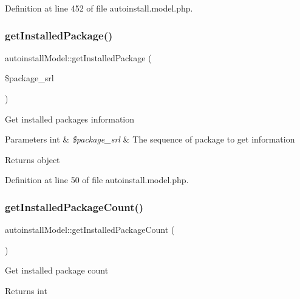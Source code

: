 Definition at line 452 of file autoinstall.\+model.\+php.

\mbox{\label{classautoinstallModel_a80912c7d12ec4d37f75d0e1475adab4e}} 
\subsubsection{\texorpdfstring{get\+Installed\+Package()}{getInstalledPackage()}}
{\footnotesize\ttfamily autoinstall\+Model\+::get\+Installed\+Package (\begin{DoxyParamCaption}\item[{}]{\$package\+\_\+srl }\end{DoxyParamCaption})}

Get installed packages information


\begin{DoxyParams}[1]{Parameters}
int & {\em \$package\+\_\+srl} & The sequence of package to get information \\
\hline
\end{DoxyParams}
\begin{DoxyReturn}{Returns}
object 
\end{DoxyReturn}


Definition at line 50 of file autoinstall.\+model.\+php.

\mbox{\label{classautoinstallModel_a1b9cec687d137129acec8db89f8a822b}} 
\subsubsection{\texorpdfstring{get\+Installed\+Package\+Count()}{getInstalledPackageCount()}}
{\footnotesize\ttfamily autoinstall\+Model\+::get\+Installed\+Package\+Count (\begin{DoxyParamCaption}{ }\end{DoxyParamCaption})}

Get installed package count

\begin{DoxyReturn}{Returns}
int 
\end{DoxyReturn}


